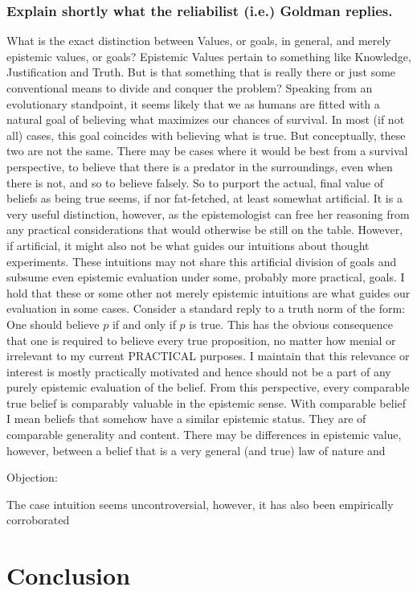 \documentclass[12pt,numbers=noenddot]{scrartcl}
\begin{document}
\subsubsection{ Explain shortly what the reliabilist (i.e.) Goldman replies.  }

What is the exact distinction between Values, or goals, in general, and merely epistemic values, or goals? Epistemic Values pertain to something like Knowledge, Justification and Truth. But is that something that is really there or just some conventional means to divide and conquer the problem? Speaking from an evolutionary standpoint, it seems likely that we as humans are fitted with a natural goal of believing what maximizes our chances of survival. In most (if not all) cases, this goal coincides with believing what is true. But conceptually, these two are not the same. There may be cases where it would be best from a survival perspective, to believe that there is a predator in the surroundings, even when there is not, and so to believe falsely. So to purport the actual, final value of beliefs as being true seems, if nor fat-fetched, at least somewhat artificial. It is a very useful distinction, however, as the epistemologist can free her reasoning from any practical considerations that would otherwise be still on the table. However, if artificial, it might also not be what guides our intuitions about thought experiments. These intuitions may not share this artificial division of goals and subsume even epistemic evaluation under some, probably more practical, goals. I hold that these or some other not merely epistemic intuitions are what guides our evaluation in some cases. Consider a standard reply to a truth norm of the form: One should believe $p$ if and only if $p$ is true. This has the obvious consequence that one is required to believe every true proposition, no matter how menial or irrelevant to my current PRACTICAL purposes. I maintain that this relevance or interest is mostly practically motivated and hence should not be a part of any purely epistemic evaluation of the belief. From this perspective, every comparable true belief is comparably valuable in the epistemic sense. With comparable belief I mean beliefs that somehow have a similar epistemic status. They are of comparable generality and content. There may be differences in epistemic value, however, between a belief that is a very general (and true) law of nature and

Objection: 

The case intuition seems uncontroversial, however, it has also been empirically corroborated \textcite{Andow2016}
\section{Conclusion}


\printbibliography
\end{document}
